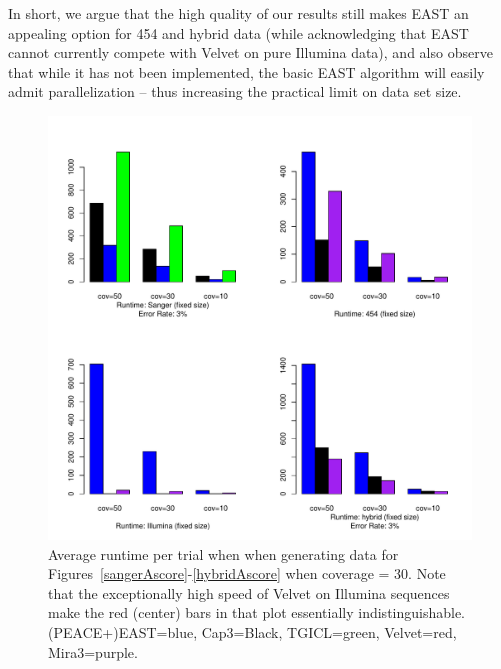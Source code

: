 \documentclass[10pt]{bmc_article}
\newcommand{\peace} {{\small PEACE}}
\newcommand{\capthree} {{\small Cap3}}
\newcommand{\tgicl} {{\small TGICL}}
\newcommand{\east} {{\small EAST}}
\newcommand{\velvet}{{\small Velvet}}
\newcommand{\mira}{{\small Mira3}}
\newenvironment{bmcformat}{\begin{raggedright}\baselineskip20pt\sloppy\setboolean{publ}{false}}{\end{raggedright}\baselineskip20pt\sloppy}
\begin{document}
\begin{bmcformat}
\vspace{3mm}

In short, we argue that the high quality of our results still makes
\east\/ an appealing option for 454 and hybrid data (while
acknowledging that \east\/ cannot currently compete with \velvet\/ on pure
Illumina data), and also observe that while it has not been
implemented, the basic \east\/ algorithm will easily admit
parallelization -- thus increasing the practical limit on data set
size.

\begin{figure}[htb]
\centerline{\includegraphics[width=6in]{pics.d/runtime_fixedsize_sanger.pdf}}
\caption{Average runtime per trial when when generating data for
  Figures~\ref{sangerAscore}-\ref{hybridAscore}  when coverage = 30.
  Note that the exceptionally high speed of \velvet\/ on Illumina sequences make the
  red (center) bars in that plot essentially indistinguishable.
  (\peace+)\east=blue, \capthree=Black, \tgicl=green,
  \velvet=red, \mira=purple.}
\label{runtime.fixed}
\end{figure}


\end{bmcformat}
\end{document}
